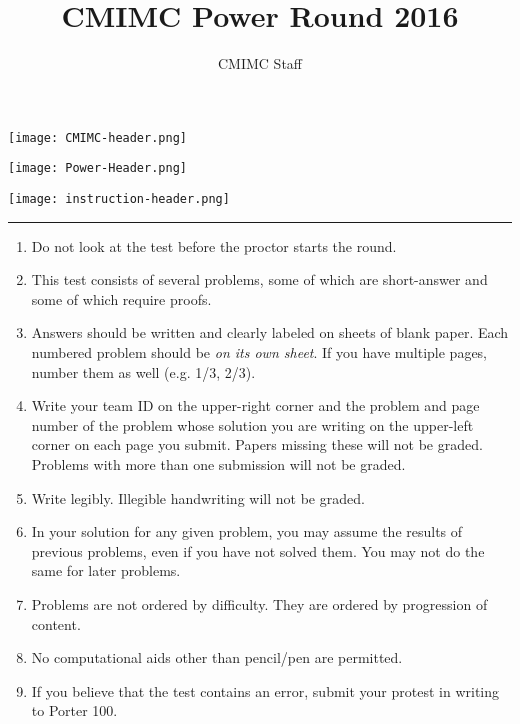 \documentclass[11pt]{article}
\title{CMIMC Power Round 2016}
\author{CMIMC Staff}
\newcounter{enum}
\begin{document}
\thispagestyle{empty}

\begin{center}

\vspace*{70pt}

\texttt{[image: CMIMC-header.png]}

\texttt{[image: Power-Header.png]}

\end{center}

\vspace{40pt}

\begin{center}
\texttt{[image: instruction-header.png]}
\noindent\rule{17.7cm}{2pt}
\end{center}

\vspace{10pt}

\begin{enumerate}
\item Do not look at the test before the proctor starts the round.

\item This test consists of several problems, some of which are short-answer and some of which require proofs.

\item Answers should be written and clearly labeled on sheets of blank paper. Each numbered problem should be \textit{on its own sheet}. If you have multiple pages, number them as well (e.g. 1/3, 2/3).

\item Write your team ID on the upper-right corner and the problem and page number of the problem whose solution you are writing on the upper-left corner on each page you submit. Papers missing these will not be graded. Problems with more than one submission will not be graded.

\item Write legibly. Illegible handwriting will not be graded.

\item In your solution for any given problem, you may assume the results of previous problems, even if you have not solved them. You may not do the same for later problems.

\item Problems are not ordered by difficulty. They are ordered by progression of content.

\item No computational aids other than pencil/pen are permitted.

\item If you believe that the test contains an error, submit your protest in writing to Porter 100.
\end{enumerate}
\end{document}
